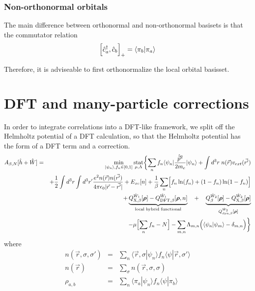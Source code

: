 \documentclass[11pt,a4paper]{report}
\begin{document}
\subsubsection{Non-orthonormal orbitals}
The main difference\cite{bloechl11_prb84_205101} between orthonormal
and non-orthonormal basisets is that the commutator relation
\begin{eqnarray}
\Bigl[\hat{c}^\dagger_a,\hat{c}_b\Bigr]_+=\langle\pi_b|\pi_a\rangle
\end{eqnarray}

Therefore, it is adviseable to first orthonormalize the local orbital
basisset.

\section{DFT and many-particle corrections}
In order to integrate correlations into a DFT-like framework, we split
off the Helmholtz potential of a DFT calculation, so that the
Helmholtz potential has the form of a DFT term and a correction.
\begin{eqnarray}
A_{\beta,N}[\hat{h}+\hat{W}]
&=&\min_{|\psi_n\rangle,f_n\in[0,1]}\operatorname*{stat}_{\mu,\Lambda}
\biggl\lbrace
\sum_n f_n\langle\psi_n|\frac{\hat{\vec{p}}^2}{2m_e}|\psi_n\rangle
+\int d^3r\;n(\vec{r})v_{ext}(\vec{r'})
\nonumber\\
&&+\frac{1}{2}\int d^3r\int d^3r'
\frac{e^2n(\vec{r})n(\vec{r'})}{4\pi\epsilon_0|\vec{r}-\vec{r'}|}
+E_{xc}[n]
+\frac{1}{\beta}\sum_n\Bigl[f_n\ln(f_n)+(1-f_n)\ln(1-f_n)\Bigr]
\nonumber\\
&&+
\underbrace{Q_{\text{X},\beta}^{\hat{W}_1}[\bm{\rho}]
   -Q_{\text{DFT},\beta}^{\hat{W}_1}[\bm{\rho},n]}_{\text{local hybrid functional}}
\quad+\quad
\underbrace{Q_{\beta}^{\hat{W}_2}[\bm{\rho}]
-Q_{\text{X},\beta}^{\hat{W}_2}[\bm{\rho}]}
_{Q_{\text{dyn},\beta}^{\hat{W}_2}[\bm{\rho}]}
\nonumber\\
&&
-\mu\Bigl[\sum_n f_n-N\Bigr]
-\sum_{m,n}\Lambda_{m,n}\Bigl(\langle\psi_n|\psi_m\rangle-\delta_{m,n}\Bigr)
\biggr\rbrace
\label{eq:hp}
\end{eqnarray}
where 
\begin{eqnarray}
n(\vec{r},\sigma,\sigma')&=&
\sum_n\langle\vec{r},\sigma|\psi_n\rangle 
f_n\langle\psi|\vec{r},\sigma'\rangle 
\nonumber\\
n(\vec{r})&=&\sum_\sigma n(\vec{r},\sigma,\sigma)
\nonumber\\
\rho_{a,b}&=&\sum_n\langle\pi_a|\psi_n\rangle 
f_n\langle\psi|\pi_b\rangle 
\end{eqnarray}
\end{document}

